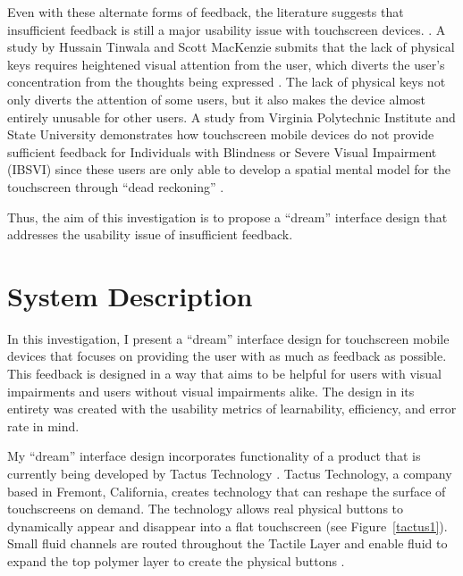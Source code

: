 \documentclass[11pt]{article}
\begin{document}
Even with these alternate forms of feedback, the literature suggests that insufficient feedback is still a major usability issue with touchscreen devices. \cite{Tinwala:2010:ETE:18	68914.1868972, Kane:2011:UGB:1978942.1979001, Hardy:2008:TIT:1409240.1409267, El-Glaly:2013:TTF:2460625.2460665, Buxton:1986:HID:22339.22386}. A study by Hussain Tinwala and Scott MacKenzie submits that the lack of physical keys requires heightened visual attention from the user, which diverts the user's concentration from the thoughts being expressed \cite{Tinwala:2010:ETE:18 68914.1868972}. The lack of physical keys not only diverts the attention of some users, but it also makes the device  almost entirely unusable for other users. A study from Virginia Polytechnic Institute and State University demonstrates how touchscreen mobile devices do not provide sufficient feedback for Individuals with Blindness or Severe Visual Impairment (IBSVI) since these users are only able to develop a spatial mental model for the touchscreen through ``dead reckoning'' \cite{El-Glaly:2013:TTF:2460625.2460665}. 

Thus, the aim of this investigation is to propose a ``dream'' interface design that addresses the usability issue of insufficient feedback.


\section{System Description}
\label{System Description}

In this investigation, I present a ``dream'' interface design for touchscreen mobile devices that focuses on providing the user with as much as feedback as possible. This feedback is designed in a way that aims to be helpful for users with visual impairments and users without visual impairments alike. The design in its entirety was created with the usability metrics of learnability, efficiency, and error rate in mind.

My ``dream'' interface design incorporates functionality of a product that is currently being developed by Tactus Technology \cite{Tactus}. Tactus Technology, a company based in Fremont, California, creates technology that can reshape the surface of touchscreens on demand. The technology allows real physical buttons to dynamically appear and disappear into a flat touchscreen (see Figure~\ref{tactus1}). Small fluid channels are routed throughout the Tactile Layer and enable fluid to expand the top polymer layer to create the physical buttons \cite{Tactus}.
\end{document}
